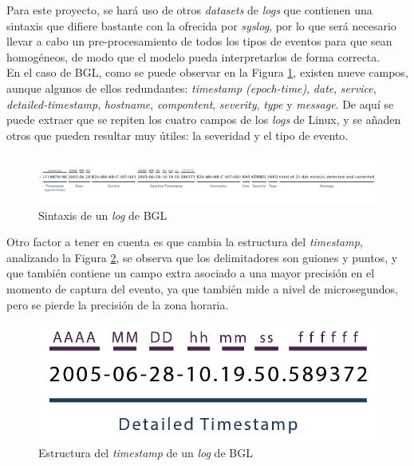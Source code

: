 Para este proyecto, se hará uso de otros \textit{datasets} de \textit{logs} que contienen una sintaxis que difiere bastante con la ofrecida por \textit{syslog}, por lo que será necesario llevar a cabo un pre-procesamiento de todos los tipos de eventos para que sean homogéneos, de modo que el modelo pueda interpretarlos de forma correcta. \\

En el caso de \gls{BGL}, como se puede observar en la Figura \ref{fig:bgl-log-structure}, existen nueve campos, aunque algunos de ellos redundantes: \textit{timestamp (epoch-time)}, \textit{date}, \textit{service}, \textit{detailed-timestamp}, \textit{hostname}, \textit{compontent}, \textit{severity}, \textit{type} y \textit{message}. De aquí se puede extraer que se repiten los cuatro campos de los \textit{logs} de Linux, y se añaden otros que pueden resultar muy útiles: la severidad y el tipo de evento.

\begin{figure}[H]
    \centering
    \includegraphics[width=1\linewidth]{imagenes/bgl-log-structure.png}
    \caption{Sintaxis de un \textit{log} de \gls{BGL}}
    \label{fig:bgl-log-structure}
\end{figure}

Otro factor a tener en cuenta es que cambia la estructura del \textit{timestamp}, analizando la Figura \ref{fig:bgl-log-timestamp}, se observa que los delimitadores son guiones y puntos, y que también contiene un campo extra asociado a una mayor precisión en el momento de captura del evento, ya que también mide a nivel de microsegundos, pero se pierde la precisión de la zona horaria.

\vspace{-1mm}

\begin{figure}[H]
    \centering
    \includegraphics[width=0.6\linewidth]{imagenes/bgl-log-structure-timestamp.png}
    \caption{Estructura del \textit{timestamp} de un \textit{log} de \gls{BGL}}
    \label{fig:bgl-log-timestamp}
\end{figure}

